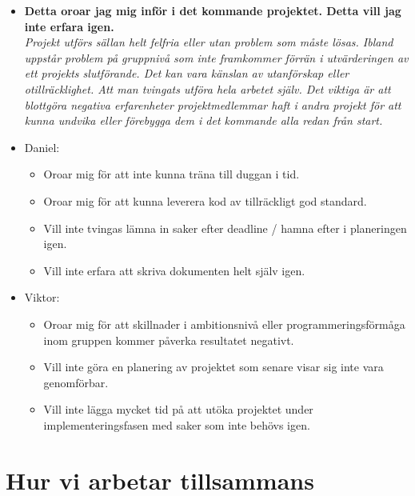 \documentclass{mall}
\begin{document}
\begin{itemize}
\item \textbf{Detta oroar jag mig inför i det kommande projektet. Detta vill jag inte erfara igen.}
  \\\emph{ Projekt utförs sällan helt felfria eller utan problem som måste lösas. Ibland uppstår problem på gruppnivå som inte framkommer förrän i utvärderingen av ett projekts slutförande. Det kan vara känslan av utanförskap eller otillräcklighet. Att man tvingats utföra hela arbetet själv. Det viktiga är att blottgöra negativa erfarenheter projektmedlemmar haft i andra projekt för att kunna undvika eller förebygga dem i det kommande alla redan från start. }

\item Daniel:
  \begin{itemize}
  \item Oroar mig för att inte kunna träna till duggan i tid.
  \item Oroar mig för att kunna leverera kod av tillräckligt god standard.
  \item Vill inte tvingas lämna in saker efter deadline / hamna efter i planeringen igen.
  \item Vill inte erfara att skriva dokumenten helt själv igen.
  \end{itemize}


  \item Viktor:
  \begin{itemize}
  \item Oroar mig för att skillnader i ambitionsnivå eller programmeringsförmåga inom gruppen kommer påverka resultatet negativt.
  \item Vill inte göra en planering av projektet som senare visar sig inte vara genomförbar.
  \item Vill inte lägga mycket tid på att utöka projektet under implementeringsfasen med saker som inte behövs igen.
  \end{itemize}
  
\end{itemize}

\section{Hur vi arbetar tillsammans}
\end{document}
